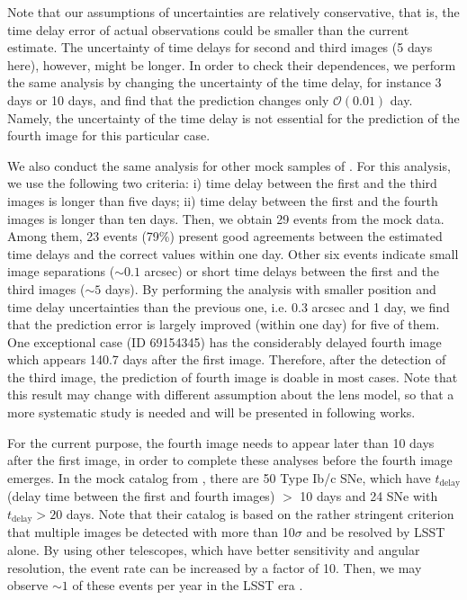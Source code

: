 \documentclass[useAMS,usenatbib,twocolumn]{mnras}
\begin{document}
Note that our assumptions of uncertainties are relatively
conservative, that is, the time delay error of actual observations
could be smaller than the current estimate. The uncertainty of time
delays for second and third images (5 days here), however, might be
longer. In order to check their dependences, we perform the same
analysis by changing the uncertainty of the time delay, for instance 3
days or 10 days, and find that the prediction changes only
$\mathcal{O}(0.01)$ day. Namely, the uncertainty of the time delay is
not essential for the prediction of the fourth image for this
particular case.

We also conduct the same analysis for other mock samples of
\cite{ogur10}. For this analysis, we use the following two criteria:
i) time delay between the first and the third images is longer than
five days; ii) time delay between the first and the fourth images is
longer than ten days. Then, we obtain 29 events from the mock
data. Among them, 23 events (79\%) present good agreements between the
estimated time delays and the correct values within one day.  Other
six events indicate small image separations ($\sim 0.1$ arcsec) or
short time delays between the first and the third images ($\sim 5$
days). By performing the analysis with smaller position and time delay
uncertainties than the previous one, i.e. 0.3 arcsec and 1 day, we
find that the prediction error is largely improved (within one day)
for five of them. One exceptional case (ID 69154345) has the
considerably delayed fourth image which appears 140.7 days after the
first image.  Therefore, after the detection of the third image, the
prediction of fourth image is doable in most cases.  Note that this
result may change with different assumption about the lens model, so
that a more systematic study is needed and will be presented in
following works.

For the current purpose, the fourth image needs to appear later than
10 days after the first image, in order to complete these analyses
before the fourth image emerges. In the mock catalog from
\cite{ogur10}, there are 50 Type Ib/c SNe, which have
$t_\mathrm{delay}$ (delay time between the first and fourth images)
$>$ 10 days and 24 SNe with $t_\mathrm{delay}>20$ days. Note that
their catalog is based on the rather stringent criterion that multiple
images be detected with more than 10$\sigma$ and be resolved by LSST
alone. By using other telescopes, which have better sensitivity and
angular resolution, the event rate can be increased by a factor of
10. Then, we may observe $\sim 1$ of these events per year in the LSST
era \citep[see also][]{gold17a}.
\end{document}
